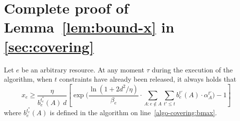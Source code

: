 \section{Complete proof of Lemma~\ref{lem:bound-x} in \cref{sec:covering}} \label{apix:lemma-proof}
\setcounter{theorem}{0}
\begin{lemma}
	Let $e$ be an arbitrary resource.
	At any moment $\tau$ during the execution of the algorithm,
	when $t$ constraints have already been released, it always holds that
	$$
	x_{e}	\geq  \frac{\eta}{b^{t_{e}^{*}}_{e}(A) \ d}
			\left[ \exp\biggl( \frac{\ln(1+2d^{2}/\eta)}{\beta_{e}}
					\cdot \sum_{A: e \notin A} \sum_{t' \le t} b^{t'}_{e}(A) \cdot \alpha^{t'}_{A} \biggr) - 1 \right]
	$$
	where $b^{t_{e}^{*}}_{e}(A)$ is defined in the algorithm on line~\ref{algo-covering:bmax}.
\end{lemma}
